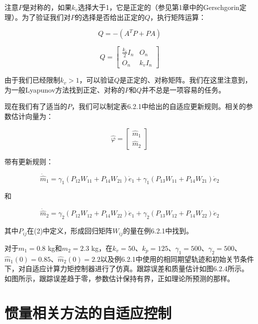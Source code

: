 \documentclass[12pt,a4paper]{ctexart}
\begin{document}
注意$P$是对称的，如果$k_v$选择大于1，它是正定的（参见第1章中的Gerschgorin定理）。为了验证我们对$P$的选择是否给出正定的$Q$，执行矩阵运算：

\begin{equation}
Q = -(A^T P + PA)
\end{equation}

\begin{equation}
Q = \begin{bmatrix} \frac{k_v}{2} I_n & O_n \\ O_n & k_v I_n \end{bmatrix}
\end{equation}

由于我们已经限制$k_v > 1$，可以验证$Q$是正定的、对称矩阵。我们在这里注意到，为一般Lyapunov方法找到正定、对称的$P$和$Q$并不总是一项容易的任务。

现在我们有了适当的$P$，我们可以制定表6.2.1中给出的自适应更新规则。相关的参数估计向量为：

\begin{equation}
\hat{\varphi} = \begin{bmatrix} \hat{m}_1 \\ \hat{m}_2 \end{bmatrix}
\end{equation}

带有更新规则：

\begin{equation}
\dot{\hat{m}}_1 = \gamma_1 (P_{12} W_{11} + P_{14} W_{21}) \dot{e}_1 + \gamma_1 (P_{13} W_{11} + P_{14} W_{21}) \dot{e}_2
\end{equation}

和

\begin{equation}
\dot{\hat{m}}_2 = \gamma_2 (P_{12} W_{12} + P_{14} W_{22}) \dot{e}_1 + \gamma_2 (P_{13} W_{12} + P_{14} W_{22}) \dot{e}_2
\end{equation}

其中$P_{ij}$在(2)中定义，形成回归矩阵$W_{ij}$的量在例6.2.1中找到。

对于$m_1 = 0.8$ kg和$m_2 = 2.3$ kg，在$k_v = 50$、$k_p = 125$、$\gamma_1 = 500$、$\gamma_2 = 500$、$\hat{m}_1(0) = 0.85$、$\hat{m}_2(0) = 2.2$以及例6.2.1中使用的相同期望轨迹和初始关节条件下，对自适应计算力矩控制器进行了仿真。跟踪误差和质量估计如图6.2.4所示。如图所示，跟踪误差趋于零，参数估计保持有界，正如理论所预测的那样。

\section{惯量相关方法的自适应控制}\label{sec:inertia-related}
\end{document}
